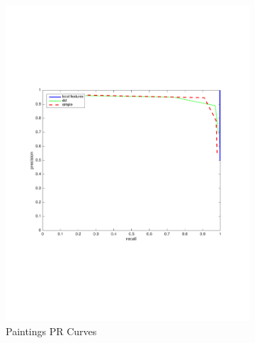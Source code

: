 \documentclass[english,12pt,a4paper,pdftex,elec,utf8, table]{aaltothesis}
\begin{document}
\begin{figure}[htb]
\begin{center}
\begin{subfigure}[b]{0.49\textwidth}
    \includegraphics[width=\textwidth]{figures/Shave10pxPR.pdf}
    \caption{Paintings PR Curves}
    \label{Shaverocthinglink}
  \end{subfigure}
  \begin{subfigure}[b]{0.49\textwidth}

\end{subfigure}
\end{center}
\end{figure}
\end{document}
